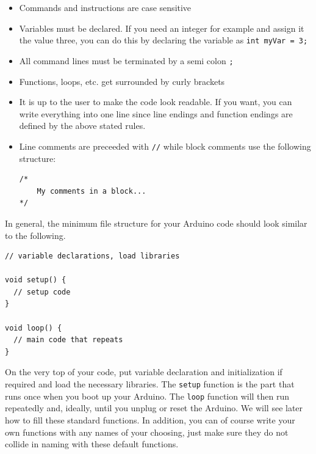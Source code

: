 \begin{itemize}
    \item Commands and instructions are case sensitive
    \item Variables must be declared. If you need an integer for example and assign it the value three, you can do this by declaring the variable as \lstinline{int myVar = 3;}
    \item All command lines must be terminated by a semi colon \lstinline{;}
    \item Functions, loops, etc. get surrounded by curly brackets
    \item It is up to the user to make the code look readable. If you want, you can write everything into one line since line endings and function endings are defined by the above stated rules.
    \item Line comments are preceeded with \lstinline{//} while block comments use the following structure:
    \begin{lstlisting}
/*
    My comments in a block...
*/
    \end{lstlisting}
\end{itemize}

In general, the minimum file structure for your Arduino code should look similar to the following.
\begin{lstlisting}
// variable declarations, load libraries

void setup() {
  // setup code
}

void loop() {
  // main code that repeats
}
\end{lstlisting}
On the very top of your code, put variable declaration and initialization if required and load the necessary libraries. The \lstinline{setup} function is the part that runs once when you boot up your Arduino. The \lstinline{loop} function will then run repeatedly and, ideally, until you unplug or reset the Arduino. We will see later how to fill these standard functions. In addition, you can of course write your own functions with any names of your choosing, just make sure they do not collide in naming with these default functions. 

